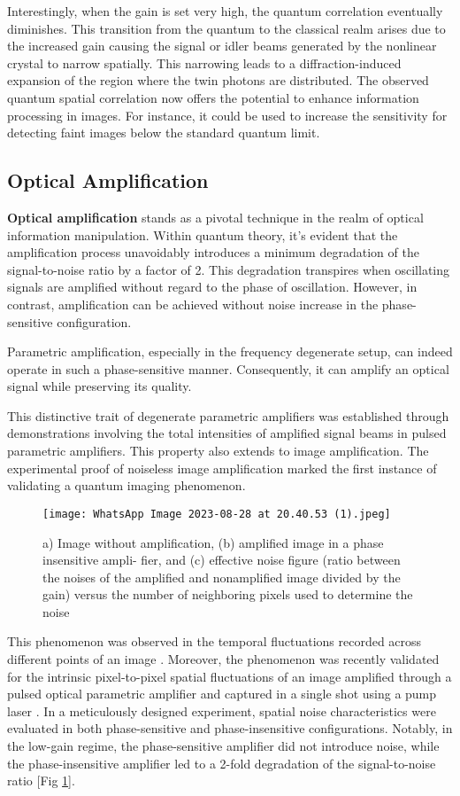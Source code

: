 \documentclass{article}
\begin{document}
Interestingly, when the gain is set very high, the quantum correlation eventually diminishes. This transition from the quantum to the classical realm arises due to the increased gain causing the signal or idler beams generated by the nonlinear crystal to narrow spatially. This narrowing leads to a diffraction-induced expansion of the region where the twin photons are distributed. The observed quantum spatial correlation now offers the potential to enhance information processing in images. For instance, it could be used to increase the sensitivity for detecting faint images below the standard quantum limit.
\subsection{Optical Amplification}
\textbf{Optical amplification} stands as a pivotal technique in the realm of optical information manipulation. Within quantum theory, it's evident that the amplification process unavoidably introduces a minimum degradation of the signal-to-noise ratio by a factor of 2. This degradation transpires when oscillating signals are amplified without regard to the phase of oscillation. However, in contrast, amplification can be achieved without noise increase in the phase-sensitive configuration.

Parametric amplification, especially in the frequency degenerate setup, can indeed operate in such a phase-sensitive manner. Consequently, it can amplify an optical signal while preserving its quality.

This distinctive trait of degenerate parametric amplifiers was established through demonstrations involving the total intensities of amplified signal beams in pulsed parametric amplifiers. This property also extends to image amplification. The experimental proof of noiseless image amplification marked the first instance of validating a quantum imaging phenomenon. 
\begin{figure}[h]
    \centering
    \texttt{[image: WhatsApp Image 2023-08-28 at 20.40.53 (1).jpeg]}
    \caption{a) Image without amplification, (b) amplified image in a phase insensitive ampli-
fier, and (c) effective noise figure (ratio between the noises of the amplified and nonamplified
image divided by the gain) versus the number of neighboring pixels used to determine the noise}
    \label{hi}
\end{figure}

This phenomenon was observed in the temporal fluctuations recorded across different points of an image \cite{PhysRevLett.83.1938}. Moreover, the phenomenon was recently validated for the intrinsic pixel-to-pixel spatial fluctuations of an image amplified through a pulsed optical parametric amplifier and captured in a single shot using a pump laser \cite{article}. In a meticulously designed experiment, spatial noise characteristics were evaluated in both phase-sensitive and phase-insensitive configurations. Notably, in the low-gain regime, the phase-sensitive amplifier did not introduce noise, while the phase-insensitive amplifier led to a 2-fold degradation of the signal-to-noise ratio [Fig \ref{hi}]. 
\end{document}
